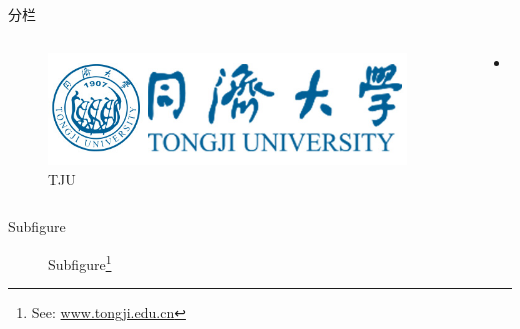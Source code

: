 \documentclass[hyperref,UTF8,11pt]{beamer}
\numberwithin{equation}{section} %
\begin{document}
\begin{frame}{分栏}
    \begin{columns}
        \begin{column}{0.3\textwidth}
            \begin{figure}
                \centering
                \includegraphics[width=0.95\textwidth]{tj_logo.jpg}
                \caption{TJU}\label{fig:tju}
            \end{figure}
        \end{column}
        \begin{column}{0.7\textwidth}
            \begin{itemize}
                \item ...
            \end{itemize}
        \end{column}
    \end{columns}
\end{frame}

\begin{frame}{Subfigure}
    \begin{figure}
        \centering
        \caption{Subfigure\footnote{See: \url{www.tongji.edu.cn}}}\label{fig:rnn}
    \end{figure}
\end{frame}
\end{document}
